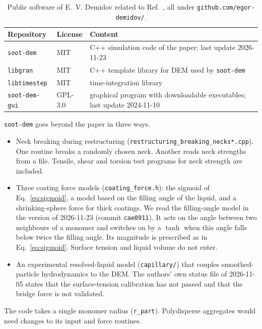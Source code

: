 \documentclass[11pt,a4paper]{article}
\begin{document}
\begin{table}[htbp]
  \centering
  \caption{Public software of E.~V. Demidov related to Ref.~\cite{demidov2024}, all under \texttt{github.com/egor-demidov/}.}
  \label{tab:software}
  \small
  \begin{tabular}{>{\raggedright\arraybackslash}p{40mm}l>{\raggedright\arraybackslash}p{80mm}}
    \toprule
    Repository & License & Content \\
    \midrule
    \texttt{soot-dem} & MIT & C++ simulation code of the paper; last update 2026-11-23 \\
    \texttt{libgran} & MIT & C++ template library for DEM used by \texttt{soot-dem} \\
    \texttt{libtimestep} & MIT & time-integration library \\
    \texttt{soot-dem-gui} & GPL-3.0 & graphical program with downloadable executables; last update 2024-11-10 \\
    \bottomrule
  \end{tabular}
\end{table}

\texttt{soot-dem} goes beyond the paper in three ways.
\begin{itemize}
  \item Neck breaking during restructuring (\texttt{restructuring\_breaking\_necks*.cpp}).
        One routine breaks a randomly chosen neck.
        Another reads neck strengths from a file.
        Tensile, shear and torsion test programs for neck strength are included.
  \item Three coating force models (\texttt{coating\_force.h}): the sigmoid of Eq.~\eqref{eq:sigmoid}, a model based on the filling angle of the liquid, and a shrinking-sphere force for thick coatings.
        We read the filling-angle model in the version of 2026-11-23 (commit \texttt{cae0911}).
        It acts on the angle between two neighbours of a monomer and switches on by a $\tanh$ when this angle falls below twice the filling angle.
        Its magnitude is prescribed as in Eq.~\eqref{eq:sigmoid}.
        Surface tension and liquid volume do not enter.
  \item An experimental resolved-liquid model (\texttt{capillary/}) that couples smoothed-particle hydrodynamics to the DEM.
        The authors' own status file of 2026-11-05 states that the surface-tension calibration has not passed and that the bridge force is not validated.
\end{itemize}
The code takes a single monomer radius (\texttt{r\_part}).
Polydisperse aggregates would need changes to its input and force routines.
\end{document}
